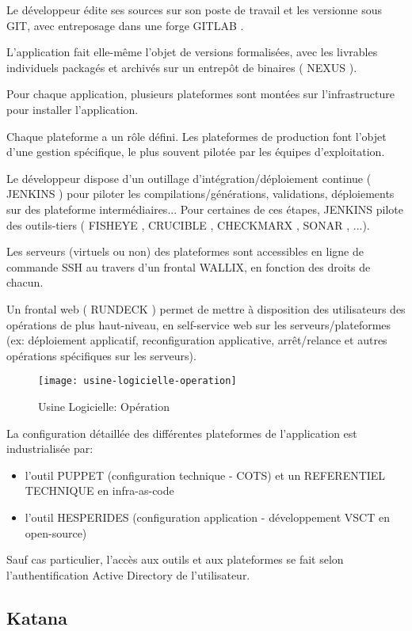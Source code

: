 Le développeur édite ses sources sur son poste de travail et les versionne sous GIT, avec entreposage dans une forge GITLAB .

L'application fait elle-même l'objet de versions formalisées, avec les livrables individuels packagés et archivés sur un entrepôt de binaires ( NEXUS ).

Pour chaque application, plusieurs plateformes sont montées sur l'infrastructure pour installer l'application.

Chaque plateforme a un rôle défini. Les plateformes de production font l'objet d'une gestion spécifique, le plus souvent pilotée par les équipes d'exploitation.

Le développeur dispose d'un outillage d'intégration/déploiement continue ( JENKINS ) pour piloter les compilations/générations, validations, déploiements sur des plateforme intermédiaires...
Pour certaines de ces étapes, JENKINS pilote des outils-tiers ( FISHEYE , CRUCIBLE , CHECKMARX , SONAR , ...).

Les serveurs (virtuels ou non) des plateformes sont accessibles en ligne de commande SSH au travers d'un frontal WALLIX, en fonction des droits de chacun.

Un frontal web ( RUNDECK ) permet de mettre à disposition des utilisateurs des opérations de plus haut-niveau, en self-service web sur les serveurs/plateformes (ex: déploiement applicatif, reconfiguration applicative, arrêt/relance et autres opérations spécifiques sur les serveurs).

\begin{figure}[h]
\centering
\texttt{[image: usine-logicielle-operation]}
\caption{Usine Logicielle: Opération}
\end{figure}

La configuration détaillée des différentes plateformes de l'application est industrialisée par:
\begin{itemize}
  \item l'outil PUPPET (configuration technique - COTS) et un REFERENTIEL TECHNIQUE en infra-as-code
  \item l'outil HESPERIDES (configuration application - développement VSCT en open-source)
\end{itemize}

Sauf cas particulier, l'accès aux outils et aux plateformes se fait selon l'authentification Active Directory de l'utilisateur.
\subsection{Katana}

